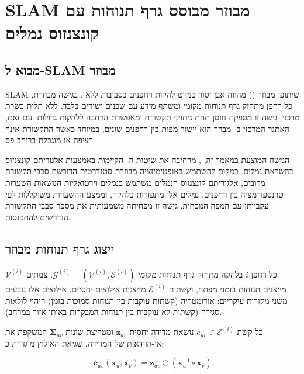 

\section{SLAM מבוזר מבוסס גרף תנוחות עם קונצנזוס נמלים}
\label{sec:ch04_decentralized_slam}

\subsection{מבוא ל-SLAM מבוזר}
\label{sec:ch04_intro}

SLAM שיתופי מבוזר () מהווה אבן יסוד בניווט להקות רחפנים בסביבות ללא . בגישה מבוזרת, כל רחפן מתחזק גרף תנוחות מקומי ומשתף מידע עם שכנים ישירים בלבד, ללא תלות בשרת מרכזי. גישה זו מספקת חוסן תחת ניתוקי תקשורת ומאפשרת הרחבה ללהקות גדולות. עם זאת, האתגר המרכזי ב- מבוזר הוא יישור מפות בין רחפנים שונים, במיוחד כאשר התקשורת אינה רציפה או מוגבלת ברוחב פס.

הגישה המוצעת במאמר זה, , מרחיבה את שיטות ה- הקיימות באמצעות אלגוריתם קונצנזוס בהשראת נמלים. במקום להשתמש באופטימיזציה מבוזרת סטנדרטית הדורשת סבבי תקשורת מרובים, אלגוריתם קונצנזוס הנמלים משתמש בנמלים וירטואליות הנושאות השערות טרנספורמציה בין רחפנים. נמלים אלו מתפזרות בלהקה, וממצע ההשערות משוקללות לפי עקביותן עם המפה הנוכחית. גישה זו מפחיתה משמעותית את מספר סבבי התקשורת הנדרשים להתכנסות.

\subsection{ייצוג גרף תנוחות מבוזר}
\label{sec:ch04_graph_representation}

כל רחפן $i$ בלהקה מתחזק גרף תנוחות מקומי $\mathcal{G}^{(i)} = (\mathcal{V}^{(i)}, \mathcal{E}^{(i)})$. צמתים $\mathcal{V}^{(i)}$ מייצגים תנוחות בזמני מפתח, וקשתות $\mathcal{E}^{(i)}$ מייצגות אילוצים יחסיים. אילוצים אלו נובעים משני מקורות עיקריים: אודומטריה (קשתות עוקבות בין תנוחות סמוכות בזמן) וזיהוי לולאות סגירה (קשתות לא עוקבות בין תנוחות המבקרות באותו אזור במרחב).

כל קשת $e_{uv} \in \mathcal{E}^{(i)}$ נושאת מדידה יחסית $\mathbf{z}_{uv}$ ומטריצת שונות $\mathbf{\Sigma}_{uv}$ המשקפת את אי-הוודאות של המדידה. שגיאת האילוץ מוגדרת כ:

\begin{equation}
\mathbf{e}_{uv}(\mathbf{x}_{u}, \mathbf{x}_{v}) = \mathbf{z}_{uv} \ominus (\mathbf{x}_{u}^{-1} \circ \mathbf{x}_{v})
\label{eq:ch04_constraint_error}
\end{equation}


